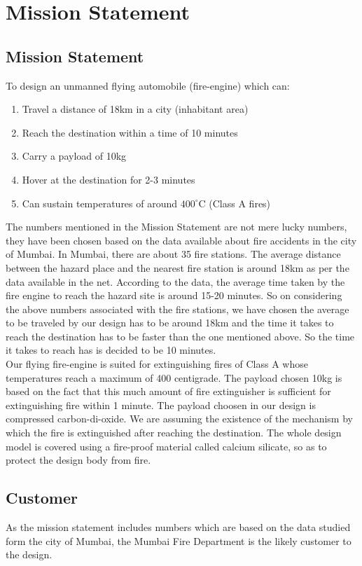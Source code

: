 \chapter{Mission Statement}
\section{Mission Statement}
To design an unmanned flying automobile (fire-engine) which can:
\begin{enumerate}
\item Travel a distance of 18km in a city (inhabitant area)
\item Reach the destination within a time of 10 minutes
\item Carry a payload of 10kg
\item Hover at the destination for 2-3 minutes
\item Can sustain temperatures of around $400^\circ$C (Class A fires)
\end{enumerate}
The numbers mentioned in the Mission Statement are not mere lucky numbers, they have been chosen based on the data available about fire accidents in the city of Mumbai. In Mumbai, there are about 35 fire stations. The average distance between the hazard place and the nearest fire station is around 18km as per the data available in the net. According to the data, the average time taken by the fire engine to reach the hazard site is around 15-20 minutes. So on considering the above numbers associated with the fire stations, we have chosen the average to be traveled by our design has to be around 18km and the time it takes to reach the destination has to be faster than the one mentioned above. So the time it takes to reach has is decided to be 10 minutes.\\
Our flying fire-engine is suited for extinguishing fires of Class A whose temperatures reach a maximum of 400 centigrade. The payload chosen 10kg is based on the fact that this much amount of fire extinguisher is sufficient for extinguishing fire within 1 minute. The payload choosen in our design is compressed carbon-di-oxide. We are assuming the existence of the mechanism by which the fire is extinguished after reaching the destination.
The whole design model is covered using a fire-proof material called calcium silicate, so as to protect the design body from fire.
\section{Customer}
As the mission statement includes numbers which are based on the data studied form the city of Mumbai, the Mumbai Fire Department is the likely customer to the design.
